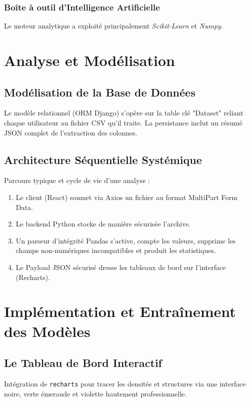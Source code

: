 \documentclass[12pt, a4paper]{report}
\begin{document}
\subsection{Boîte à outil d'Intelligence Artificielle}
Le moteur analytique a exploité principalement \textit{Scikit-Learn} et \textit{Numpy}.
\lipsum[53-58]

\chapter{Analyse et Modélisation}
\section{Modélisation de la Base de Données}
Le modèle relationnel (ORM Django) s'opère sur la table clé "Dataset" reliant chaque utilisateur au fichier CSV qu'il traite. La persistance inclut un résumé JSON complet de l'extraction des colonnes.
\lipsum[59-69]

\section{Architecture Séquentielle Systémique}
Parcours typique et cycle de vie d'une analyse :
\begin{enumerate}
    \item Le client (React) soumet via Axios un fichier au format MultiPart Form Data.
    \item Le backend Python stocke de manière sécurisée l'archive.
    \item Un parseur d'intégrité Pandas s'active, compte les valeurs, supprime les champs non-numériques incompatibles et produit les statistiques.
    \item Le Payload JSON sécurisé dresse les tableaux de bord sur l'interface (Recharts).
\end{enumerate}
\lipsum[70-80]

\chapter{Implémentation et Entraînement des Modèles}
\section{Le Tableau de Bord Interactif}
Intégration de \texttt{recharts} pour tracer les densités et structures via une interface noire, verte émeraude et violette hautement professionnelle.
\lipsum[81-90]
\end{document}
